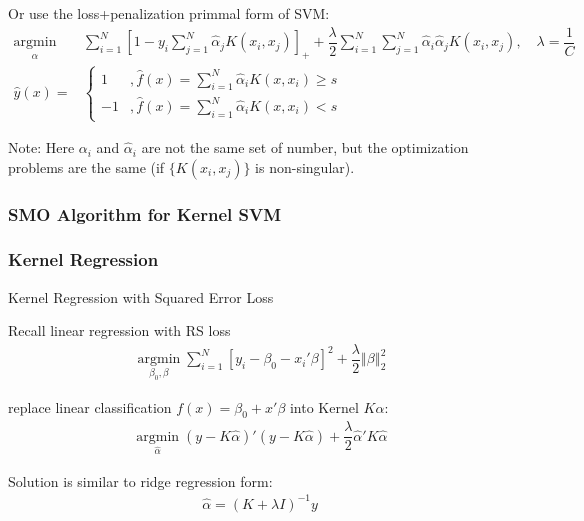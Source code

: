     Or use the loss+penalization primmal form of SVM:
    \begin{align}
        \mathop{\arg\min}\limits_{\hat{\alpha } }&\sum_{i=1}^N\left[ 1-y_i\sum_{j=1}^N\hat{\alpha }_jK(x_i,x_j) \right]_++\dfrac{\lambda }{2}\sum_{i=1}^N\sum_{j=1}^N\hat{\alpha }_i\hat{\alpha }_jK(x_i,x_j),\quad \lambda =\dfrac{1}{C} \\
        \hat{y}(x)=&\begin{cases}
            1 &,\hat{f}(x)=\sum_{i=1}^N\hat{\alpha }_iK(x,x_i)\geq s\\
            -1&,\hat{f}(x)=\sum_{i=1}^N\hat{\alpha }_iK(x,x_i)<s
        \end{cases}
    \end{align}
    
    Note: Here $ \alpha _i $ and $ \hat{\alpha }_i $ are not the same set of number, but the optimization problems are the same (if $ \{K(x_i,x_j)\} $ is non-singular). 

\subsubsection{SMO Algorithm for Kernel SVM}
    
    
\subsubsection{Kernel Regression}
\begin{point}
    Kernel Regression with Squared Error Loss
\end{point}

     Recall linear regression with RS loss
     \begin{align}
        \mathop{\arg\min}\limits_{\beta_0,\beta  }\sum_{i=1}^N\left[ y_i-\beta _0-x_i'\beta  \right]^2+\dfrac{\lambda }{2}\left\Vert \beta \right\Vert^2_2
     \end{align}

     replace linear classification $ f(x)=\beta _0+x'\beta  $ into Kernel $ K\alpha  $:
     \begin{align}
        \mathop{\arg\min}\limits_{\hat{\alpha }}(y-K\hat{\alpha } )'(y-K\hat{\alpha } ) +\dfrac{\lambda }{2}\hat{\alpha } 'K\hat{\alpha } 
     \end{align}

     Solution is similar to ridge regression form:
     \begin{align}
        \hat{\alpha }=(K+\lambda I)^{-1}y 
     \end{align}     

